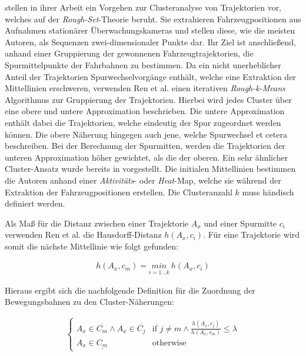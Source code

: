 \cite[]{Ren2014} stellen in ihrer Arbeit ein Vorgehen zur Clusteranalyse von Trajektorien vor,
welches auf der \textit{Rough-Set}-Theorie beruht. Sie extrahieren Fahrzeugpositionen aus Aufnahmen stationärer
Überwachungskameras und stellen diese, wie die meisten Autoren, als Sequenzen zwei-dimensionaler
Punkte dar. Ihr Ziel ist anschließend, anhand einer Gruppierung der gewonnenen Fahrzeugtrajektorien,
die Spurmittelpunkte der Fahrbahnen zu bestimmen. Da ein nicht unerheblicher Anteil der Trajektorien Spurwechselvorgänge
enthält, welche eine Extraktion der Mittellinien erschweren, verwenden Ren et al. einen iterativen \textit{Rough-k-Means}
Algorithmus zur Gruppierung der Trajektorien. Hierbei wird jedes Cluster über eine obere und untere Approximation beschrieben.
Die untere Approximation enthält dabei die Trajektorien, welche eindeutig der Spur zugeordnet werden können.
Die obere Näherung hingegen auch jene, welche Spurwechsel et cetera beschreiben. Bei der Berechnung der Spurmitten, werden
die Trajektorien der unteren Approximation höher gewichtet, als die der oberen. Ein sehr ähnlicher Cluster-Ansatz wurde
bereits in \cite[]{Lingras2004} vorgestellt.
Die initialen Mittellinien bestimmen die Autoren anhand einer \textit{Aktivitäts}- oder \textit{Heat}-Map,
welche sie während der Extraktion der Fahrzeugpositionen erstellen. Die Clusteranzahl $k$ muss händisch definiert werden.

Als Maß für die Distanz zwischen einer Trajektorie $A_x$ und einer Spurmitte $c_i$ verwenden Ren et al. die
Hausdorff-Distanz $h(A_x, c_i)$. Für eine Trajektorie wird somit die nächste Mittellinie wie folgt gefunden:

\begin{ceqn}
\begin{align}
    h(A_x, c_m) = \underset{i = 1 ... k}{min}\ h(A_x, c_i)
\end{align}
\end{ceqn}

Hieraus ergibt sich die nachfolgende Definition für die Zuordnung der Bewegungsbahnen zu den Cluster-Näherungen:

\begin{ceqn}
\begin{align}
    \begin{cases}
        A_x \in \overline{C_m} \land A_x \in \overline{C_j} & \text{if } j \neq m \land \frac{h(A_x, c_j)}{h(A_x, c_m)} \leq \lambda \\
        A_x \in \underline{C_m} & \text{otherwise}
    \end{cases}
\end{align}
\end{ceqn}

